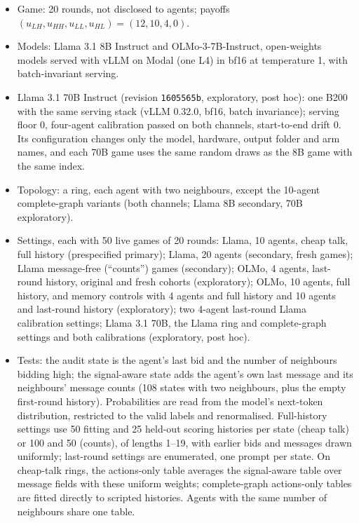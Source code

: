 \documentclass[11pt,letterpaper]{article}
\begin{document}
\begin{itemize}
  \item Game: 20 rounds, not disclosed to agents; payoffs $(u_{LH}, u_{HH}, u_{LL}, u_{HL}) = (12, 10, 4, 0)$.
  \item Models: Llama 3.1 8B Instruct and OLMo-3-7B-Instruct, open-weights models served with vLLM on Modal (one L4) in bf16 at temperature 1, with batch-invariant serving.
  \item Llama 3.1 70B Instruct (revision \texttt{1605565b}, exploratory, post hoc): one B200 with the same serving stack (vLLM 0.32.0, bf16, batch invariance); serving floor 0, four-agent calibration passed on both channels, start-to-end drift 0. Its configuration changes only the model, hardware, output folder and arm names, and each 70B game uses the same random draws as the 8B game with the same index.
  \item Topology: a ring, each agent with two neighbours, except the 10-agent complete-graph variants (both channels; Llama 8B secondary, 70B exploratory).
  \item Settings, each with 50 live games of 20 rounds: Llama, 10 agents, cheap talk, full history (prespecified primary); Llama, 20 agents (secondary, fresh games); Llama message-free (``counts'') games (secondary); OLMo, 4 agents, last-round history, original and fresh cohorts (exploratory); OLMo, 10 agents, full history, and memory controls with 4 agents and full history and 10 agents and last-round history (exploratory); two 4-agent last-round Llama calibration settings; Llama 3.1 70B, the Llama ring and complete-graph settings and both calibrations (exploratory, post hoc).
  \item Tests: the audit state is the agent's last bid and the number of neighbours bidding high; the signal-aware state adds the agent's own last message and its neighbours' message counts (108 states with two neighbours, plus the empty first-round history).
    Probabilities are read from the model's next-token distribution, restricted to the valid labels and renormalised.
    Full-history settings use 50 fitting and 25 held-out scoring histories per state (cheap talk) or 100 and 50 (counts), of lengths 1--19, with earlier bids and messages drawn uniformly; last-round settings are enumerated, one prompt per state.
    On cheap-talk rings, the actions-only table averages the signal-aware table over message fields with these uniform weights; complete-graph actions-only tables are fitted directly to scripted histories.
    Agents with the same number of neighbours share one table.

\end{itemize}
\end{document}
